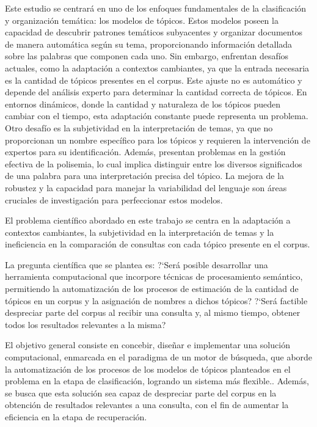 Este estudio se centrará en uno de los enfoques fundamentales de la clasificación y organización temática: los modelos de tópicos. Estos modelos poseen la capacidad de descubrir patrones temáticos subyacentes y organizar documentos de manera automática según su tema, proporcionando información detallada sobre las palabras que componen cada uno. Sin embargo, enfrentan desafíos actuales, como la adaptación a contextos cambiantes, ya que la entrada necesaria es la cantidad de tópicos presentes en el corpus. Este ajuste no es automático y depende del análisis experto para determinar la cantidad correcta de tópicos. En entornos dinámicos, donde la cantidad y naturaleza de los tópicos pueden cambiar con el tiempo, esta adaptación constante puede representa un problema. Otro desaf\'io es la subjetividad en la interpretación de temas, ya que no proporcionan un nombre específico para los t\'opicos y requieren la intervención de expertos para su identificación. Adem\'as, presentan problemas en la gestión efectiva de la polisemia, lo cual implica distinguir entre los diversos significados de una palabra para una interpretación precisa del tópico. La mejora de la robustez y la capacidad para manejar la variabilidad del lenguaje son áreas cruciales de investigación para perfeccionar estos modelos. 


El problema científico  abordado en este trabajo se centra en la adaptación a contextos cambiantes, la subjetividad en la interpretación de temas y la ineficiencia en la comparación de consultas con cada tópico presente en el corpus.

La pregunta cient\'ifica  que se plantea es: ?`Será posible desarrollar una herramienta computacional que incorpore técnicas de procesamiento semántico, permitiendo la automatización de los procesos de estimación de la cantidad de tópicos en un corpus y la asignación de nombres a dichos tópicos? ?`Será factible despreciar parte del corpus al recibir una consulta y, al mismo tiempo, obtener todos los resultados relevantes a la misma?

El objetivo general  consiste en concebir, diseñar e implementar una solución computacional, enmarcada en el paradigma de un motor de búsqueda, que aborde la automatización de los procesos de los modelos de tópicos planteados en el problema en la etapa de clasificación, logrando un sistema más flexible.. Además, se busca que esta solución sea capaz de despreciar parte del corpus en la obtención de resultados relevantes a una consulta, con el fin de aumentar la eficiencia en la etapa de recuperación.

